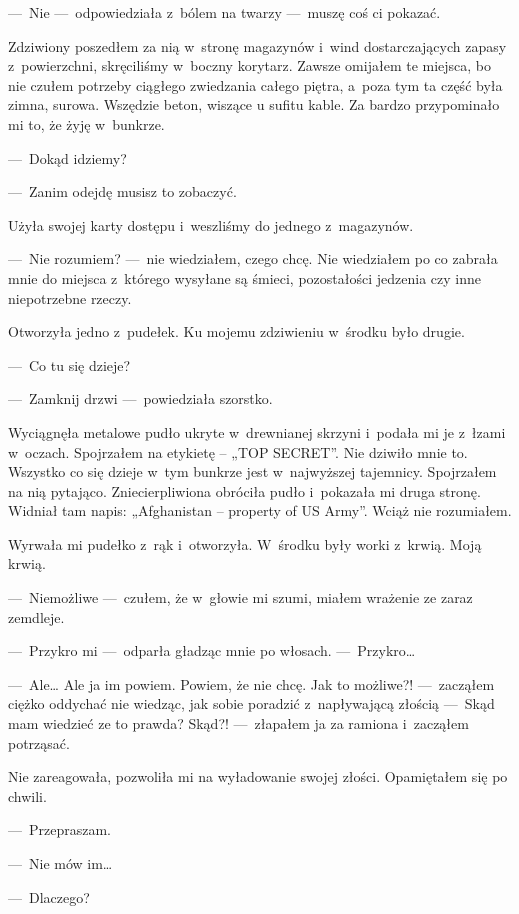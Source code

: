 ---~Nie ---~odpowiedziała z~bólem na twarzy ---~muszę coś ci pokazać.

Zdziwiony poszedłem za nią w~stronę magazynów i~wind dostarczających zapasy z~powierzchni, skręciliśmy w~boczny korytarz. Zawsze omijałem te miejsca, bo nie czułem potrzeby ciągłego zwiedzania całego piętra, a~poza tym ta część była zimna, surowa. Wszędzie beton, wiszące u sufitu kable. Za bardzo przypominało mi to, że żyję w~bunkrze. 

---~Dokąd idziemy? 

---~Zanim odejdę musisz to zobaczyć.

Użyła swojej karty dostępu i~weszliśmy do jednego z~magazynów. 

\paraSep

---~Nie rozumiem? ---~nie wiedziałem, czego chcę. Nie wiedziałem po co zabrała mnie do miejsca z~którego wysyłane są śmieci, pozostałości jedzenia czy inne niepotrzebne rzeczy. 

Otworzyła jedno z~pudełek. Ku mojemu zdziwieniu w~środku było drugie.

---~Co tu się dzieje? 

---~Zamknij drzwi ---~powiedziała szorstko.

Wyciągnęła metalowe pudło ukryte w~drewnianej skrzyni i~podała mi je z~łzami w~oczach. Spojrzałem na etykietę – „TOP SECRET”. Nie dziwiło mnie to. Wszystko co się dzieje w~tym bunkrze jest w~najwyższej tajemnicy. Spojrzałem na nią pytająco. Zniecierpliwiona obróciła pudło i~pokazała mi druga stronę. 
Widniał tam napis: „Afghanistan -- property of US Army”. Wciąż nie rozumiałem. 

Wyrwała mi pudełko z~rąk i~otworzyła. W~środku były worki z~krwią. Moją krwią. 

---~Niemożliwe ---~czułem, że w~głowie mi szumi, miałem wrażenie ze zaraz zemdleje.

---~Przykro mi ---~odparła gładząc mnie po włosach. ---~Przykro…

---~Ale… Ale ja im powiem. Powiem, że nie chcę. Jak to możliwe?! ---~zacząłem ciężko oddychać nie wiedząc, jak sobie poradzić z~napływającą złością ---~Skąd mam wiedzieć ze to prawda? Skąd?! ---~złapałem ja za ramiona i~zacząłem potrząsać. 

Nie zareagowała, pozwoliła mi na wyładowanie swojej złości. Opamiętałem się po chwili.

---~Przepraszam.

---~Nie mów im…

---~Dlaczego?

